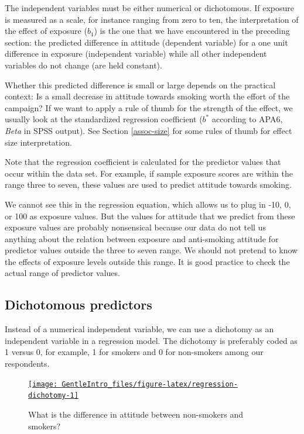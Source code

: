 \documentclass[a4paper]{book}
\theoremstyle{definition}
\theoremstyle{definition}
\theoremstyle{definition}
\theoremstyle{remark}
\begin{document}
The independent variables must be either numerical or dichotomous. If
exposure is measured as a scale, for instance ranging from zero to ten,
the interpretation of the effect of exposure (\(b_1\)) is the one that
we have encountered in the preceding section: the predicted difference
in attitude (dependent variable) for a one unit difference in exposure
(independent variable) while all other independent variables do not
change (are held constant).

Whether this predicted difference is small or large depends on the
practical context: Is a small decrease in attitude towards smoking worth
the effort of the campaign? If we want to apply a rule of thumb for the
strength of the effect, we usually look at the standardized regression
coefficient (\(b^*\) according to APA6, \emph{Beta} in SPSS output). See
Section \ref{assoc-size} for some rules of thumb for effect size
interpretation.

Note that the regression coefficient is calculated for the predictor
values that occur within the data set. For example, if sample exposure
scores are within the range three to seven, these values are used to
predict attitude towards smoking.

We cannot see this in the regression equation, which allows us to plug
in -10, 0, or 100 as exposure values. But the values for attitude that
we predict from these exposure values are probably nonsensical because
our data do not tell us anything about the relation between exposure and
anti-smoking attitude for predictor values outside the three to seven
range. We should not pretend to know the effects of exposure levels
outside this range. It is good practice to check the actual range of
predictor values.

\subsection{Dichotomous predictors}\label{dichpredictor}

Instead of a numerical independent variable, we can use a dichotomy as
an independent variable in a regression model. The dichotomy is
preferably coded as 1 versus 0, for example, 1 for smokers and 0 for
non-smokers among our respondents.

\begin{figure}[H]
\href{http://82.196.4.233:3838/apps/regression-dichotomy/}{\texttt{[image: GentleIntro\_files/figure-latex/regression-dichotomy-1]} }\caption{What is the difference in attitude between non-smokers and smokers?}\label{fig:regression-dichotomy}
\end{figure}
\end{document}
